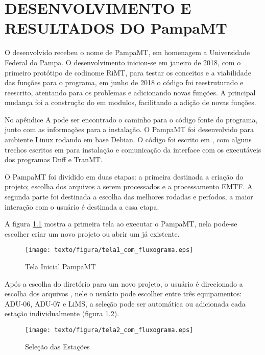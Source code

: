 \chapter{DESENVOLVIMENTO E RESULTADOS DO PampaMT}

    O  desenvolvido recebeu o nome de PampaMT, em homenagem a Universidade Federal do Pampa. O desenvolvimento iniciou-se em janeiro de 2018, com o primeiro protótipo de codinome RiMT, para testar os conceitos e a viabilidade das funções para o programa, em junho de 2018 o código foi reestruturado e reescrito, atentando para os problemas e adicionando novas funções. A principal mudança foi a construção do  em modulos, facilitando a adição de novas funções.
    
    No apêndice A pode ser encontrado o caminho para o código fonte do programa, junto com as informações para a instalação. O PampaMT foi desenvolvido para ambiente Linux rodando em base Debian. O código foi escrito em \Python, com alguns trechos escritos em \Shell{} para instalação e comunicação da interface com os executáveis dos programas Dnff e TranMT.
    
    O PampaMT foi dividido em duas etapas: a primeira destinada a criação do projeto; escolha dos arquivos a serem processados e a processamento EMTF. A segunda parte foi destinada a escolha das melhores rodadas e períodos, a maior interação com o usuário é destinada a essa etapa. 
    
    A figura \ref{tela_inicial} mostra a primeira tela ao executar o PampaMT, nela pode-se escolher criar um novo projeto ou abrir um já existente.
    
    \begin{figure}[H]
        \caption{Tela Inicial PampaMT}
            \begin{center}
                \texttt{[image: texto/figura/tela1\_com\_fluxograma.eps]}
            \end{center}
        \label{tela_inicial}
    \end{figure}
    
     Após a escolha do diretório para um novo projeto, o usuário é direcionado a escolha dos arquivos , nele o usuário pode escolher entre três equipamentos: ADU-06, ADU-07 e LiMS, a seleção pode ser automática ou adicionada cada estação individualmente (figura \ref{tela_sel_site}). 
    
    \begin{figure}[H]
        \caption{Seleção das Estações}
            \begin{center}
                \texttt{[image: texto/figura/tela2\_com\_fluxograma.eps]}
            \end{center}
        \label{tela_sel_site}
    \end{figure}
    
